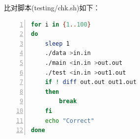 \documentclass{article}
\begin{document}
比对脚本(testing/chk.sh)如下：

\begin{lstlisting}[language={bash},
    numbers=left,
    numberstyle=\tiny\consolas,
    basicstyle=\small\consolas]
for i in {1..100}
do
    sleep 1
    ./data >in.in
    ./main <in.in >out.out
    ./test <in.in >out1.out
    if ! diff out.out out1.out
    then
        break
    fi
    echo "Correct"
done
\end{lstlisting}
\end{document}
